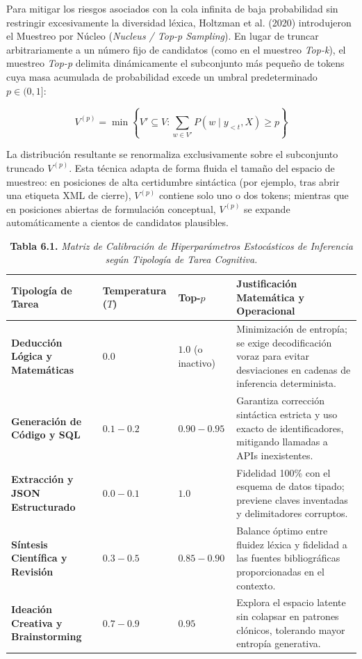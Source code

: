 Para mitigar los riesgos asociados con la cola infinita de baja probabilidad sin restringir excesivamente la diversidad léxica, Holtzman et al. (2020) introdujeron el Muestreo por Núcleo (\textit{Nucleus / Top-p Sampling}). En lugar de truncar arbitrariamente a un número fijo de candidatos (como en el muestreo \textit{Top-k}), el muestreo \textit{Top-p} delimita dinámicamente el subconjunto más pequeño de tokens cuya masa acumulada de probabilidad excede un umbral predeterminado $p \in (0, 1]$:

\begin{equation}
V^{(p)} = \min \left\{ V' \subseteq V : \sum_{w \in V'} P(w \mid y_{<t}, X) \ge p \right\}
\end{equation}

La distribución resultante se renormaliza exclusivamente sobre el subconjunto truncado $V^{(p)}$. Esta técnica adapta de forma fluida el tamaño del espacio de muestreo: en posiciones de alta certidumbre sintáctica (por ejemplo, tras abrir una etiqueta XML de cierre), $V^{(p)}$ contiene solo uno o dos tokens; mientras que en posiciones abiertas de formulación conceptual, $V^{(p)}$ se expande automáticamente a cientos de candidatos plausibles.

\begin{table}[htpb!]
\centering
\small
\renewcommand{\arraystretch}{1.3}
\begin{tabularx}{\textwidth}{>{\raggedright\arraybackslash\bfseries}p{3.2cm} >{\centering\arraybackslash}p{1.8cm} >{\centering\arraybackslash}p{1.8cm} >{\raggedright\arraybackslash}X}
\toprule
Tipología de Tarea & Temperatura ($T$) & Top-$p$ & Justificación Matemática y Operacional \\
\midrule
Deducción Lógica y Matemáticas & $0.0$ & $1.0$ (o inactivo) & Minimización de entropía; se exige decodificación voraz para evitar desviaciones en cadenas de inferencia determinista. \\
Generación de Código y SQL & $0.1 - 0.2$ & $0.90 - 0.95$ & Garantiza corrección sintáctica estricta y uso exacto de identificadores, mitigando llamadas a APIs inexistentes. \\
Extracción y JSON Estructurado & $0.0 - 0.1$ & $1.0$ & Fidelidad 100\% con el esquema de datos tipado; previene claves inventadas y delimitadores corruptos. \\
Síntesis Científica y Revisión & $0.3 - 0.5$ & $0.85 - 0.90$ & Balance óptimo entre fluidez léxica y fidelidad a las fuentes bibliográficas proporcionadas en el contexto. \\
Ideación Creativa y Brainstorming & $0.7 - 0.9$ & $0.95$ & Explora el espacio latente sin colapsar en patrones clónicos, tolerando mayor entropía generativa. \\
\bottomrule
\end{tabularx}
\caption{\textbf{Tabla 6.1.} \textit{Matriz de Calibración de Hiperparámetros Estocásticos de Inferencia según Tipología de Tarea Cognitiva.}}
\label{tab:sampling_params}
\end{table}

